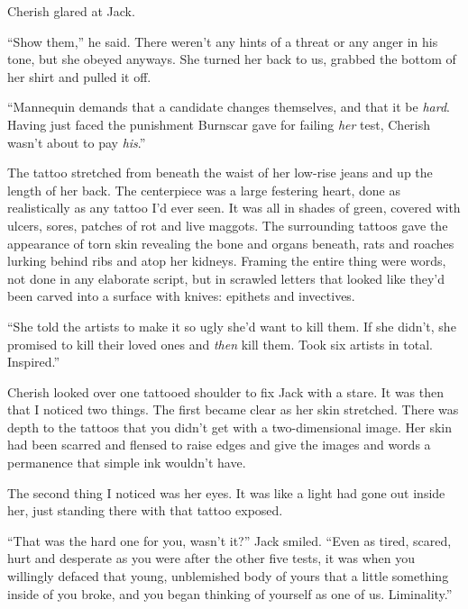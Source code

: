 Cherish glared at Jack.



``Show them,'' he said.  There weren't any hints of a threat or any anger in his tone, but she obeyed anyways.  She turned her back to us, grabbed the bottom of her shirt and pulled it off.



``Mannequin demands that a candidate changes themselves, and that it be \emph{hard}.  Having just faced the punishment Burnscar gave for failing \emph{her} test, Cherish wasn't about to pay \emph{his}.''



The tattoo stretched from beneath the waist of her low-rise jeans and up the length of her back.  The centerpiece was a large festering heart, done as realistically as any tattoo I'd ever seen.  It was all in shades of green, covered with ulcers, sores, patches of rot and live maggots.  The surrounding tattoos gave the appearance of torn skin revealing the bone and organs beneath, rats and roaches lurking behind ribs and atop her kidneys.  Framing the entire thing were words, not done in any elaborate script, but in scrawled letters that looked like they'd been carved into a surface with knives: epithets and invectives.



``She told the artists to make it so ugly she'd want to kill them.  If she didn't, she promised to kill their loved ones and \emph{then} kill them.  Took six artists in total.  Inspired.''



Cherish looked over one tattooed shoulder to fix Jack with a stare.  It was then that I noticed two things.  The first became clear as her skin stretched.  There was depth to the tattoos that you didn't get with a two-dimensional image.  Her skin had been scarred and flensed to raise edges and give the images and words a permanence that simple ink wouldn't have.



The second thing I noticed was her eyes.  It was like a light had gone out inside her, just standing there with that tattoo exposed.



``That was the hard one for you, wasn't it?'' Jack smiled.  ``Even as tired, scared, hurt and desperate as you were after the other five tests, it was when you willingly defaced that young, unblemished body of yours that a little something inside of you broke, and you began thinking of yourself as one of us.  Liminality.''



